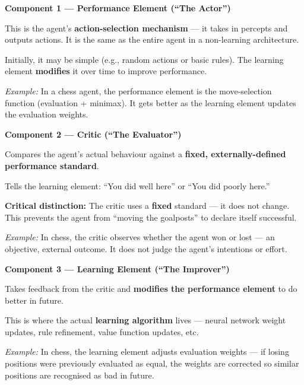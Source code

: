 \documentclass[12pt, a4paper]{article}
\begin{document}
\vspace{0.5em}

\noindent\textbf{Component 1 — Performance Element (``The Actor'')}
\begin{keypoints}
  \item This is the agent's \textbf{action-selection mechanism} — it takes in percepts and outputs actions. It is the same as the entire agent in a non-learning architecture.
  \item Initially, it may be simple (e.g., random actions or basic rules). The learning element \textbf{modifies} it over time to improve performance.
  \item \emph{Example:} In a chess agent, the performance element is the move-selection function (evaluation + minimax). It gets better as the learning element updates the evaluation weights.
\end{keypoints}

\noindent\textbf{Component 2 — Critic (``The Evaluator'')}
\begin{keypoints}
  \item Compares the agent's actual behaviour against a \textbf{fixed, externally-defined performance standard}.
  \item Tells the learning element: ``You did well here'' or ``You did poorly here.''
  \item \textbf{Critical distinction:} The critic uses a \textbf{fixed} standard — it does not change. This prevents the agent from ``moving the goalposts'' to declare itself successful.
  \item \emph{Example:} In chess, the critic observes whether the agent won or lost — an objective, external outcome. It does not judge the agent's intentions or effort.
\end{keypoints}

\noindent\textbf{Component 3 — Learning Element (``The Improver'')}
\begin{keypoints}
  \item Takes feedback from the critic and \textbf{modifies the performance element} to do better in future.
  \item This is where the actual \textbf{learning algorithm} lives — neural network weight updates, rule refinement, value function updates, etc.
  \item \emph{Example:} In chess, the learning element adjusts evaluation weights — if losing positions were previously evaluated as equal, the weights are corrected so similar positions are recognised as bad in future.
\end{keypoints}
\end{document}
